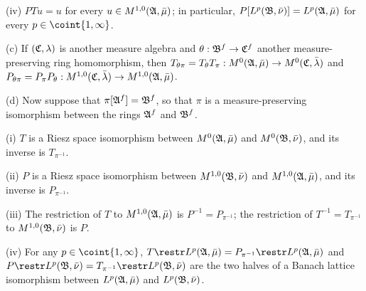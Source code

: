 \quad(iv) $PTu=u$ for every $u\in M^{1,0}(\frak A,\bar\mu)$;  in
particular, $P[L^p(\frak B,\bar\nu)]=L^p(\frak A,\bar\mu)$ for every
$p\in\coint{1,\infty}$.

(c) If $(\frak C,\lambda)$ is another measure algebra and
$\theta:\frak B^f\to\frak C^f$ another measure-preserving ring
homomorphism, then $T_{\theta\pi}
=T_{\theta}T_{\pi}:M^0(\frak A,\bar\mu)\to M^0(\frak C,\bar\lambda)$ and
$P_{\theta\pi}=P_{\pi}P_{\theta}:M^{1,0}(\frak C,\bar\lambda)\to
M^{1,0}(\frak A,\bar\mu)$.

(d) Now suppose that $\pi[\frak A^f]=\frak B^f$, so that $\pi$ is a
measure-preserving isomorphism between the rings $\frak A^f$ and
$\frak B^f$.

\quad(i) $T$ is a Riesz space isomorphism between $M^0(\frak A,\bar\mu)$
and $M^0(\frak B,\bar\nu)$, and its inverse is $T_{\pi^{-1}}$.

\quad(ii) $P$ is a Riesz space isomorphism between
$M^{1,0}(\frak B,\bar\nu)$ and $M^{1,0}(\frak A,\bar\mu)$, and its
inverse is $P_{\pi^{-1}}$.

\quad(iii) The restriction of $T$ to $M^{1,0}(\frak A,\bar\mu)$ is
$P^{-1}=P_{\pi^{-1}}$;  the restriction of
$T^{-1}=T_{\pi^{-1}}$ to $M^{1,0}(\frak B,\bar\nu)$ is $P$.

\quad(iv) For any $p\in\coint{1,\infty}$,
$T\restr L^p(\frak A,\bar\mu)=P_{\pi^{-1}}\restr L^p(\frak A,\bar\mu)$
and $P\restr L^p(\frak B,\bar\nu)
=T_{\pi^{-1}}\restr L^p(\frak B,\bar\nu)$ are
the two halves of a Banach lattice isomorphism between
$L^p(\frak A,\bar\mu)$ and $L^p(\frak B,\bar\nu)$.

